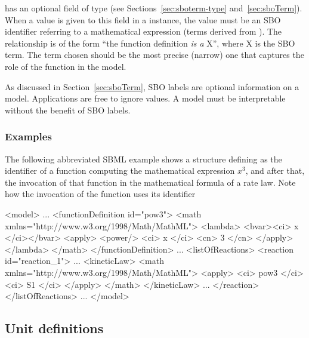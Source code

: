 \FunctionDefinition has an optional  field of type
 (see Sections~\ref{sec:sboterm-type}
and~\ref{sec:sboTerm}).  When a value is given to this field in a
\FunctionDefinition instance, the value must be an SBO identifier
referring to a mathematical expression (\ie terms derived from
\sbomathformula).  The relationship is of the form ``the function
definition \emph{is a} X'', where X is the SBO term.  The term
chosen should be the most precise (narrow) one that captures the
role of the function in the model.

As discussed in Section~\ref{sec:sboTerm}, SBO labels are optional
information on a model.  Applications are free to ignore
 values.  A model must be interpretable without the
benefit of SBO labels.


\subsubsection{Examples}

The following abbreviated SBML example shows a \FunctionDefinition
structure defining  as the identifier of a function
computing the mathematical expression $x^{3}$, and after that, the
invocation of that function in the mathematical formula of a rate
law.  Note how the invocation of the function uses its identifier
\begin{example}
<model>
    ...
    <functionDefinition id="pow3">
        <math xmlns="http://www.w3.org/1998/Math/MathML">
            <lambda>
                <bvar><ci> x </ci></bvar>
                <apply>
                    <power/>
                    <ci> x </ci>
                    <cn> 3 </cn>
                </apply>
            </lambda>
        </math>
    </functionDefinition>
    ...
    <listOfReactions>
        <reaction id="reaction_1">
            ...
            <kineticLaw>
                <math xmlns="http://www.w3.org/1998/Math/MathML">
                    <apply>
                        <ci> pow3 </ci>
                        <ci> S1 </ci>
                     </apply>
                </math>
            </kineticLaw>
            ...
        </reaction>
    </listOfReactions>
    ...
</model>
\end{example}


\subsection{Unit definitions}
\label{sec:unitdefinitions}

